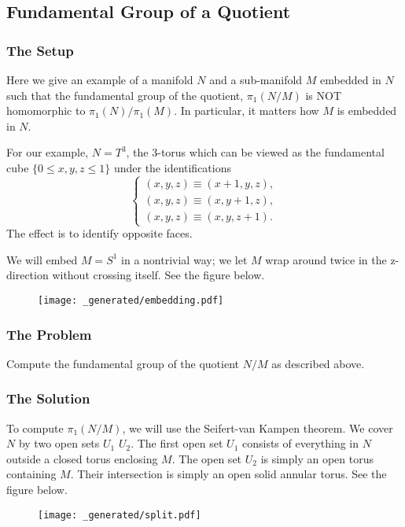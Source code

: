 \subsection{Fundamental Group of a Quotient}

\subsubsection*{The Setup}

Here we give an example of a manifold \(N\) and a sub-manifold \(M\) embedded in \(N\) such that
the fundamental group of the quotient, \(\pi_1(N / M)\) is NOT homomorphic to \(\pi_1(N) / \pi_1(M)\).
In particular, it matters how \(M\) is embedded in \(N\). 

For our example, \(N = T^3\), the 3-torus which can be viewed as the fundamental cube \(\{0 \leq x, y, z\leq 1\}\)
under the identifications
\begin{equation}
\begin{cases}
(x, y, z) \equiv (x + 1, y, z), \\
(x, y, z) \equiv (x, y + 1, z), \\
(x, y, z) \equiv (x, y, z + 1).
\end{cases}
\end{equation} 
The effect is to identify opposite faces.

We will embed \(M = S^1\) in a nontrivial way; we let \(M\) wrap around twice in the z-direction without crossing
itself. See the figure below.
\begin{figure}[h]
\centering
\texttt{[image: \_generated/embedding.pdf]}
\end{figure} 

\subsubsection*{The Problem}

Compute the fundamental group of the quotient \(N / M\) as described above.

\subsubsection*{The Solution}

To compute \(\pi_1(N / M)\), we will use the Seifert-van Kampen theorem. We cover \(N\) by two open sets \(U_1\)
\(U_2\). The first open set \(U_1\) consists of everything in \(N\) outside a closed torus enclosing \(M\). The
open set \(U_2\) is simply an open torus containing \(M\). Their intersection is simply an open solid annular torus.
See the figure below.  
\begin{figure}[h]
\centering
\texttt{[image: \_generated/split.pdf]}
\end{figure}

